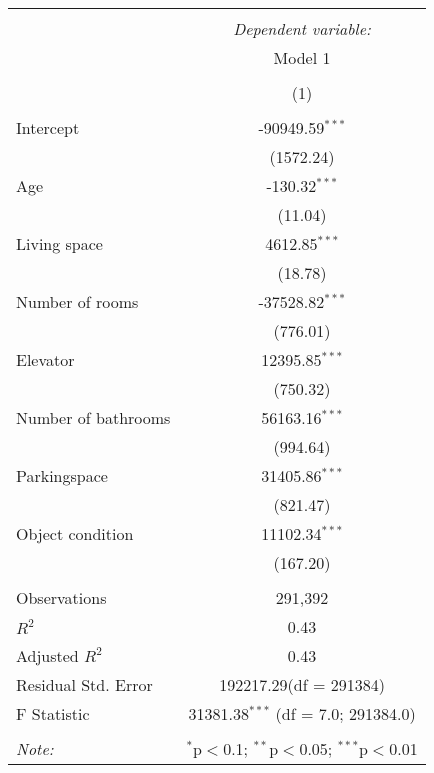 \begin{table}[!htbp] \centering
\begin{tabular}{@{\extracolsep{5pt}}lc}
\\[-1.8ex]\hline
\hline \\[-1.8ex]
& \multicolumn{1}{c}{\textit{Dependent variable:}} \
\cr \cline{1-2}
\\[-1.8ex] & \multicolumn{1}{c}{Model 1} \\\\[-1.8ex] & (1) \\
\hline \\[-1.8ex]
 Intercept & -90949.59$^{***}$ \\
  & (1572.24) \\
 Age & -130.32$^{***}$ \\
  & (11.04) \\
 Living space & 4612.85$^{***}$ \\
  & (18.78) \\
 Number of rooms & -37528.82$^{***}$ \\
  & (776.01) \\
 Elevator & 12395.85$^{***}$ \\
  & (750.32) \\
 Number of bathrooms & 56163.16$^{***}$ \\
  & (994.64) \\
 Parkingspace & 31405.86$^{***}$ \\
  & (821.47) \\
 Object condition & 11102.34$^{***}$ \\
  & (167.20) \\
\hline \\[-1.8ex]
 Observations & 291,392 \\
 $R^2$ & 0.43 \\
 Adjusted $R^2$ & 0.43 \\
 Residual Std. Error & 192217.29(df = 291384)  \\
 F Statistic & 31381.38$^{***}$ (df = 7.0; 291384.0) \\
\hline
\hline \\[-1.8ex]
\textit{Note:} & \multicolumn{1}{r}{$^{*}$p$<$0.1; $^{**}$p$<$0.05; $^{***}$p$<$0.01} \\
\end{tabular}
\end{table}